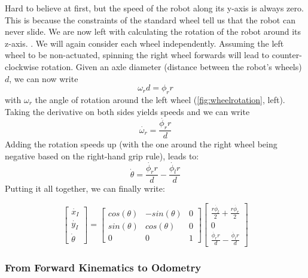 Hard to believe at first, but the speed of the robot along its y-axis is always zero. This is because the constraints of the standard wheel tell us that the robot can never slide.
We are now left with calculating the rotation of the robot around its z-axis.
.
We will again consider each wheel independently. Assuming the left wheel to be non-actuated, spinning the right wheel forwards will lead to counter-clockwise rotation. Given an axle diameter (distance between the robot's wheels) $d$, we can now write
\begin{equation}
\omega_r d = \phi_r r
\end{equation}
with $\omega_r$ the angle of rotation around the left wheel (\cref{fig:wheelrotation}, left). Taking the derivative on both sides yields speeds and we can write
\begin{equation}
\dot{\omega_r} = \frac{\dot{\phi_r} r}{d}
\end{equation}
Adding the rotation speeds up (with the one around the right wheel being negative based on the right-hand grip rule), leads to:
%
\begin{equation}
\dot{\theta}=\frac{\dot{\phi_r} r}{d}-\frac{\dot{\phi_l} r}{d}
\end{equation}
%
Putting it all together, we can finally write:

\begin{equation}\label{eq:diffwheels}
\left[\begin{array}{c} \dot{x_I}\\\dot{y_I}\\\dot{\theta}\end{array}\right]=\left[\begin{array}{ccc}
cos(\theta) & -sin(\theta) & 0 \\
sin(\theta) & cos(\theta) & 0 \\
0 & 0 & 1\end{array}\right]\left[\begin{array}{c}\frac{r\dot{\phi_l}}{2}+\frac{r\dot{\phi_r}}{2}\\0\\\frac{\dot{\phi_r} r}{d}-\frac{\dot{\phi_l} r}{d}\end{array}\right]
\end{equation}

\subsubsection{From Forward Kinematics to Odometry}

